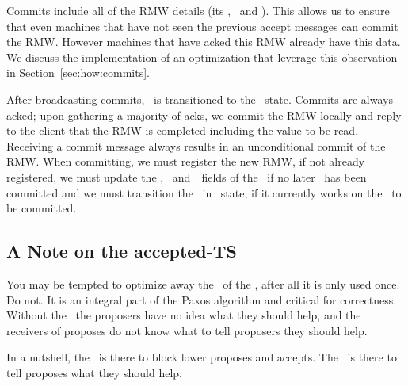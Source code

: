 \custvspace
Commits include all of the RMW details (its \rmw, \logno~and \val). This allows us to ensure that even machines that have not seen the previous accept messages can commit the RMW.
However machines that have acked this RMW already have this data. We discuss the implementation of an optimization that leverage this observation in Section~\ref{sec:how:commits}.

After broadcasting commits, \locentry~is transitioned to the \committed~state. 
Commits are always acked; upon gathering a majority of acks, we commit the RMW locally and reply to the client that the RMW is completed including the value to be read.
Receiving a commit message always results in an unconditional commit of the RMW.
When committing, we must register the new RMW, if not already registered, we must update the \val, \comlogno~and~\comrmw~fields of the \kv~if no later \logno~has been committed and we must transition the \kv~in \invalid~state, if it currently works on the \logno~to be committed.




\subsection{A Note on the accepted-TS}
You may be tempted to optimize away the \accts~of the \kv, after all it is only used once. Do not. It is an integral part of the Paxos algorithm and critical for correctness. Without the \accts~the proposers have no idea what they should help, and the receivers of proposes do not know what to tell proposers they should help.

In a nutshell, the \propts~is there to block lower proposes and accepts. The \accts~is there to tell proposes what they should help.
